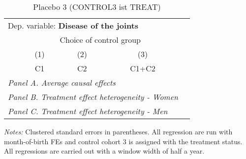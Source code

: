  \begin{table}[H] \centering \begin{threeparttable} \caption{Placebo 3 (CONTROL3 ist TREAT) } {\def\sym#1{\ifmmode^{#1}\else\(^{#1}\)\fi} \begin{tabular}{l*{4}{c}} \toprule \multicolumn{4}{l}{Dep. variable: \textbf{Disease of the joints}} \\ & \multicolumn{3}{c}{Choice of control group} \\ \cmidrule(lr){2-4}
            &\multicolumn{1}{c}{(1)}&\multicolumn{1}{c}{(2)}&\multicolumn{1}{c}{(3)}\\
            &\multicolumn{1}{c}{C1}&\multicolumn{1}{c}{C2}&\multicolumn{1}{c}{C1+C2}\\
\midrule
 \multicolumn{4}{l}{\emph{Panel A. Average causal effects}} \\      \midrule\multicolumn{4}{l}{\emph{Panel B. Treatment effect heterogeneity - Women}} \\      \midrule\multicolumn{4}{l}{\emph{Panel C. Treatment effect heterogeneity - Men}} \\      
\bottomrule \end{tabular} } \begin{tablenotes} \item \scriptsize \emph{Notes:} Clustered standard errors in parentheses. All regression are run with month-of-birth FEs and control cohort 3 is assigned with the treatment status. All regressions are carried out with a window width of half a year. \end{tablenotes} \end{threeparttable} \end{table} 
